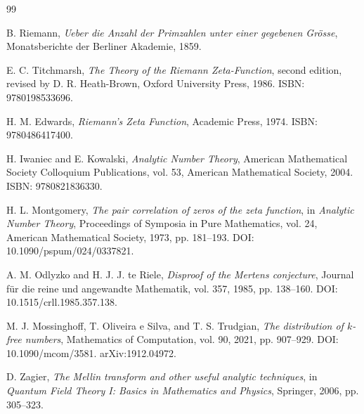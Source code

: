 \documentclass[11pt]{amsart}
\numberwithin{equation}{section}
\theoremstyle{plain}
\theoremstyle{definition}
\theoremstyle{remark}
\begin{document}
\begin{thebibliography}{99}

B. Riemann,
\emph{Ueber die Anzahl der Primzahlen unter einer gegebenen Grösse},
Monatsberichte der Berliner Akademie, 1859.

E. C. Titchmarsh,
\emph{The Theory of the Riemann Zeta-Function},
second edition, revised by D. R. Heath-Brown,
Oxford University Press, 1986.
ISBN: 9780198533696.

H. M. Edwards,
\emph{Riemann's Zeta Function},
Academic Press, 1974.
ISBN: 9780486417400.

H. Iwaniec and E. Kowalski,
\emph{Analytic Number Theory},
American Mathematical Society Colloquium Publications, vol. 53,
American Mathematical Society, 2004.
ISBN: 9780821836330.

H. L. Montgomery,
\emph{The pair correlation of zeros of the zeta function},
in \emph{Analytic Number Theory},
Proceedings of Symposia in Pure Mathematics, vol. 24,
American Mathematical Society, 1973, pp. 181--193.
DOI: 10.1090/pspum/024/0337821.

A. M. Odlyzko and H. J. J. te Riele,
\emph{Disproof of the Mertens conjecture},
Journal f\"ur die reine und angewandte Mathematik, vol. 357, 1985, pp. 138--160.
DOI: 10.1515/crll.1985.357.138.

M. J. Mossinghoff, T. Oliveira e Silva, and T. S. Trudgian,
\emph{The distribution of \(k\)-free numbers},
Mathematics of Computation, vol. 90, 2021, pp. 907--929.
DOI: 10.1090/mcom/3581.
 arXiv:1912.04972.

D. Zagier,
\emph{The Mellin transform and other useful analytic techniques},
in \emph{Quantum Field Theory I: Basics in Mathematics and Physics},
Springer, 2006, pp. 305--323.

\end{thebibliography}
\end{document}
